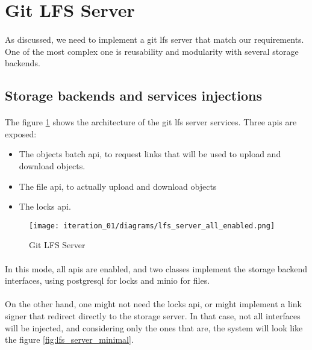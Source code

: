 \newpage
\section{Git LFS Server}

\paragraph{}
As discussed, we need to implement a git lfs server that match our requirements. One of the most complex one is reusability and modularity with several storage backends.

\subsection{Storage backends and services injections}

\paragraph{}
The figure \ref{fig:lfs_server_all_enabled} shows the architecture of the git lfs server services. Three apis are exposed:

\begin{itemize}
    \item The objects batch api, to request links that will be used to upload and download objects.
    \item The file api, to actually upload and download objects
    \item The locks api.
\end{itemize}

\begin{figure}[H]
    \centering
    \texttt{[image: iteration\_01/diagrams/lfs\_server\_all\_enabled.png]}
    \caption{Git LFS Server}
    \label{fig:lfs_server_all_enabled}
\end{figure}

\paragraph{}
In this mode, all apis are enabled, and two classes implement the storage backend interfaces, using postgresql for locks and minio for files.

\paragraph{}
On the other hand, one might not need the locks api, or might implement a link signer that redirect directly to the storage server. In that case, not all interfaces will be injected, and considering only the ones that are, the system will look like the figure \ref{fig:lfs_server_minimal}.

